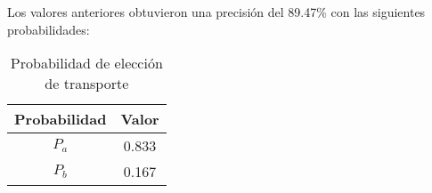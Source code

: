Los valores anteriores obtuvieron una precisión del 89.47\% con las siguientes probabilidades:

\begin{table}[H]
    \centering
    \caption{Probabilidad de elección de transporte}
    \begin{tabular}{|c|c|}
    \hline
    Probabilidad & Valor  \\ \hline
    $P_{a}$    & 0.833    \\ \hline
    $P_{b}$    & 0.167     \\ \hline
    \end{tabular}
    \label{tab:prob}
\end{table}

